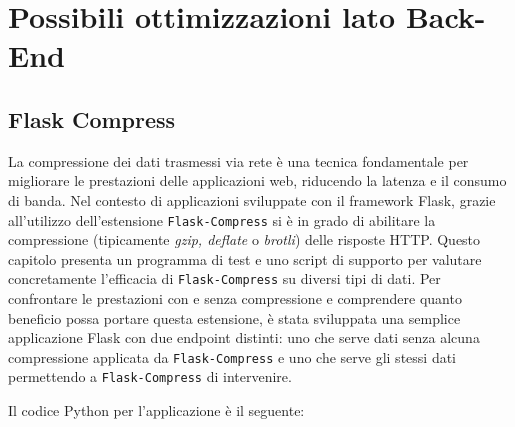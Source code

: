 \section{Possibili ottimizzazioni lato Back-End}
\label{ch:flask-compress-test}

\subsection{Flask Compress}
La compressione dei dati trasmessi via rete è una tecnica fondamentale per migliorare le prestazioni delle applicazioni web, riducendo la latenza e il consumo di banda. Nel contesto di applicazioni sviluppate con il framework Flask, grazie all'utilizzo dell'estensione \texttt{Flask-Compress} si è in grado di abilitare la compressione (tipicamente \textit{gzip, deflate} o \textit{brotli}) delle risposte HTTP. Questo capitolo presenta un programma di test e uno script di supporto per valutare concretamente l'efficacia di \texttt{Flask-Compress} su diversi tipi di dati.
Per confrontare le prestazioni con e senza compressione e comprendere quanto beneficio possa portare questa estensione, è stata sviluppata una semplice applicazione Flask con due endpoint distinti: uno che serve dati senza alcuna compressione applicata da \texttt{Flask-Compress} e uno che serve gli stessi dati permettendo a \texttt{Flask-Compress} di intervenire.

Il codice Python per l'applicazione è il seguente:

